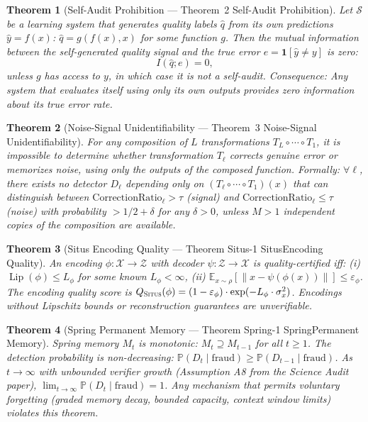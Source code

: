 \documentclass[12pt,a4paper]{article}
\newtheorem{theorem}{Theorem}[section]
\theoremstyle{definition}
\newcommand{\Situs}{\textsc{Situs}}
\DeclareMathOperator{\Lip}{Lip}
\newcommand{\E}{\mathbb{E}}
\newcommand{\Pbb}{\mathbb{P}}
\newcommand{\cS}{\mathcal{S}}
\newcommand{\cX}{\mathcal{X}}
\newcommand{\cZ}{\mathcal{Z}}
\newcommand{\ind}[1]{\mathbf{1}[#1]}
\newcommand{\norm}[1]{\left\lVert#1\right\rVert}
\begin{document}
\begin{theorem}[Self-Audit Prohibition — Theorem~2 Self-Audit Prohibition]
\label{thm:2_formal}
Let $\cS$ be a learning system that generates quality labels $\hat{q}$ from its own predictions $\hat{y} = f(x)$: $\hat{q} = g(f(x), x)$ for some function $g$. Then the mutual information between the self-generated quality signal and the true error $e = \ind{\hat{y} \neq y}$ is zero:
\[
I(\hat{q}; e) = 0,
\]
unless $g$ has access to $y$, in which case it is not a self-audit. \textit{Consequence:} Any system that evaluates itself using only its own outputs provides zero information about its true error rate.
\end{theorem}

\begin{theorem}[Noise-Signal Unidentifiability — Theorem~3 Noise-Signal Unidentifiability]
\label{thm:3_formal}
For any composition of $L$ transformations $T_L \circ \cdots \circ T_1$, it is impossible to determine whether transformation $T_\ell$ corrects genuine error or memorizes noise, using only the outputs of the composed function. Formally: $\forall \ell$, there exists no detector $D_\ell$ depending only on $(T_\ell \circ \cdots \circ T_1)(x)$ that can distinguish between $\text{CorrectionRatio}_\ell > \tau$ (signal) and $\text{CorrectionRatio}_\ell \le \tau$ (noise) with probability $> 1/2 + \delta$ for any $\delta > 0$, unless $M>1$ independent copies of the composition are available.
\end{theorem}

\begin{theorem}[Situs Encoding Quality — Theorem Situs-1 SitusEncoding Quality]
\label{thm:situs_formal}
An encoding $\phi: \cX \to \cZ$ with decoder $\psi: \cZ \to \cX$ is quality-certified iff: (i) $\Lip(\phi) \le L_\phi$ for some known $L_\phi < \infty$, (ii) $\E_{x \sim \rho}[\norm{x - \psi(\phi(x))}] \le \varepsilon_\phi$. The encoding quality score is $Q_{\Situs}(\phi) = (1-\varepsilon_\phi) \cdot \exp(-L_\phi \cdot \sigma_x^2)$. Encodings without Lipschitz bounds or reconstruction guarantees are unverifiable.
\end{theorem}

\begin{theorem}[Spring Permanent Memory — Theorem Spring-1 SpringPermanent Memory]
\label{thm:spring_formal}
Spring memory $M_t$ is monotonic: $M_t \supseteq M_{t-1}$ for all $t \ge 1$. The detection probability is non-decreasing: $\Pbb(D_t \mid \text{fraud}) \ge \Pbb(D_{t-1} \mid \text{fraud})$. As $t \to \infty$ with unbounded verifier growth (Assumption A8 from the Science Audit paper), $\lim_{t \to \infty} \Pbb(D_t \mid \text{fraud}) = 1$. Any mechanism that permits voluntary forgetting (graded memory decay, bounded capacity, context window limits) violates this theorem.
\end{theorem}
\end{document}
